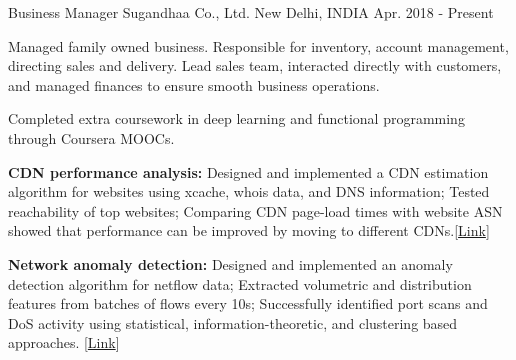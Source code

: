 
\begin{cventries}

  \cventry
    {Business Manager} %
    {Sugandhaa Co., Ltd.} %
    {New Delhi, INDIA} %
    {Apr. 2018 - Present} %
    {
      \begin{cvitems} %
      \item {Managed family owned business. Responsible for inventory, account management, directing sales and delivery. Lead sales team, interacted directly with customers, and managed finances to ensure smooth business operations.}
    \item {Completed extra coursework in deep learning and functional programming through Coursera MOOCs.}
    \item {\textbf{CDN performance analysis:} Designed and implemented a CDN estimation algorithm for websites using xcache, whois data, and DNS information; Tested reachability of top websites; Comparing CDN page-load times with website ASN showed that performance can be improved by moving to different CDNs.\hfill [\href{https://github.com/shahifaqeer/cdn-analysis}{Link}]}
    \item {\textbf{Network anomaly detection:} Designed and implemented an anomaly detection algorithm for netflow data; Extracted volumetric and distribution features from batches of flows every 10s; Successfully identified port scans and DoS activity using statistical, information-theoretic, and clustering based approaches. \hfill [\href{https://github.com/shahifaqeer/netflow-anomaly-detector}{Link}]}
      \end{cvitems}
    }


\end{cventries}
